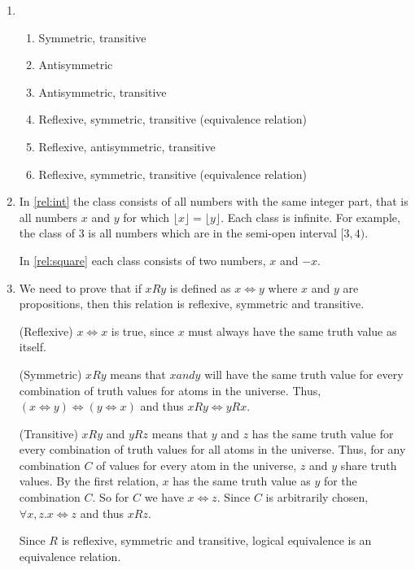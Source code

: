 \documentclass{article}
\begin{document}
\begin{enumerate}
    \item 
        \begin{enumerate}
            \item Symmetric, transitive
            \item Antisymmetric
            \item Antisymmetric, transitive
            \item  Reflexive, symmetric, transitive (equivalence relation)\label{rel:int} 
            \item Reflexive, antisymmetric, transitive
            \item \label{rel:square} Reflexive, symmetric, transitive (equivalence relation)
        \end{enumerate}

    \item In \ref{rel:int} the class consists of all numbers with the same integer part, that is all numbers $x$ and $y$ for which $\lfloor x \rfloor = \lfloor y \rfloor$. Each class is infinite. For example, the class of 3 is all numbers which are in the semi-open interval $[3, 4)$.

        In \ref{rel:square} each class consists of two numbers, $x$ and $-x$.
    \item We need to prove that if $x R y$ is defined as $x \Leftrightarrow y$ where $x$ and $y$ are propositions, then this relation is reflexive, symmetric and transitive.

        (Reflexive) $x \Leftrightarrow x$ is true, since $x$ must always have the same truth value as itself.

        (Symmetric) $x R y$ means that $x and y$ will have the same truth value for every combination of truth values for atoms in the universe. Thus, $(x \Leftrightarrow y) \Leftrightarrow (y \Leftrightarrow x)$ and thus $x R y \Leftrightarrow y R x$.

        (Transitive) $x R y$ and $y R z$ means that $y$ and $z$ has the same truth value for every combination of truth values for all atoms in the universe. Thus, for any combination $C$ of values for every atom in the universe, $z$ and $y$ share truth values. By the first relation, $x$ has the same truth value as $y$ for the combination $C$. So for $C$ we have $x \Leftrightarrow z$. Since $C$ is arbitrarily chosen, $\forall x,z. x\Leftrightarrow z$ and thus $x R z$.

        Since $R$ is reflexive, symmetric and transitive, logical equivalence is an equivalence relation.


\end{enumerate}
\end{document}
